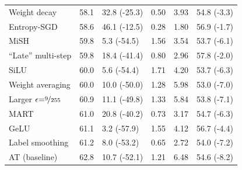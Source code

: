 \begin{table}[t]
{\begin{tabularx}{0.5\textwidth}{|X|C{0.85cm}|C{1.4cm}|C{0.85cm}|C{0.85cm}||C{1.4cm}|}
		\hspace*{2px} Weight decay & 58.1 & 32.8 (-25.3) & 0.50 & 3.93 & 54.8 (-3.3)\\
		\hspace*{2px} Entropy-SGD & 58.6 & 46.1 (-12.5) & 0.28 & 1.80 & 56.9 (-1.7)\\
		\hspace*{2px} MiSH & 59.8 & 5.3 (-54.5) & 1.56 & 3.54 & 53.7 (-6.1)\\
		\hspace*{2px} ``Late'' multi-step & 59.8 & 18.4 (-41.4) & 0.80 & 2.96 & 57.8 (-2.0)\\
		\hline
		\hspace*{2px} SiLU & 60.0 & 5.6 (-54.4) & 1.71 & 4.20 & 53.7 (-6.3)\\
		\hspace*{2px} Weight averaging & 60.0 & 10.0 (-50.0) & 1.28 & 5.98 & 53.0 (-7.0)\\
		\hspace*{2px} Larger $\epsilon{=}\nicefrac{9}{255}$ & 60.9 & 11.1 (-49.8) & 1.33 & 5.84 & 53.8 (-7.1)\\
		\hspace*{2px} MART & 61.0 & 20.8 (-40.2) & 0.73 & 3.17 & 54.7 (-6.3)\\
		\hspace*{2px} GeLU & 61.1 & 3.2 (-57.9) & 1.55 & 4.12 & 56.7 (-4.4)\\
		\hspace*{2px} Label smoothing & 61.2 & 8.0 (-53.2) & 0.65 & 2.72 & 54.0 (-7.2)\\
		\hspace*{2px} AT (baseline) & 62.8 & 10.7 (-52.1) & 1.21 & 6.48 & 54.6 (-8.2)\\
		\hline
	\end{tabularx}
	}
	

\end{table}
